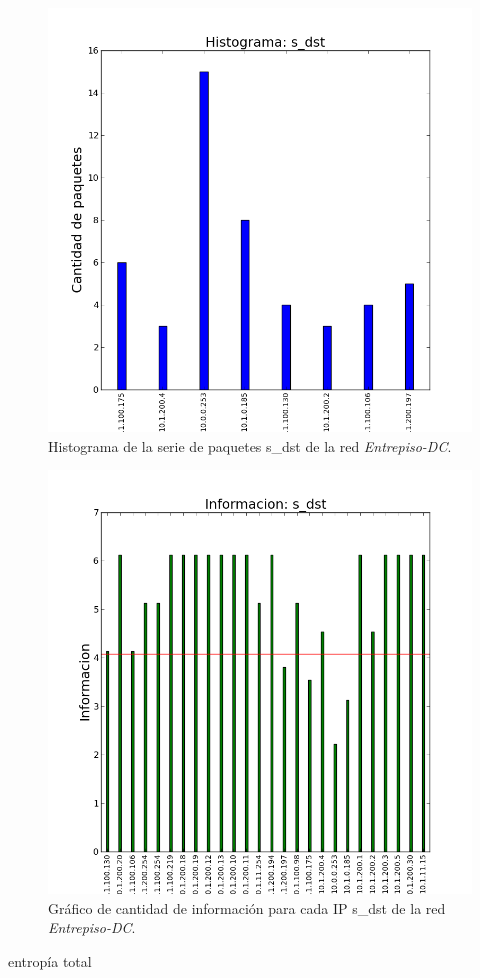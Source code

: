 \documentclass[10pt, a4paper]{article}
\begin{document}
\begin{figure}[H]
  \begin{center}
    \includegraphics[width=0.8\linewidth]{../imgs/entrepiso-dc-ips_s_dst_hist.png}
    \caption{Histograma de la serie de paquetes s\_dst de la red \emph{Entrepiso-DC}.}
    \label{fig:histograma-entrepiso-dc-s-dst}
  \end{center}
\end{figure}
\begin{figure}[H]
  \begin{center}
    \includegraphics[width=0.8\linewidth]{../imgs/entrepiso-dc-ips_s_dst_info.png}
    \caption{Gráfico de cantidad de información para cada IP s\_dst de la red \emph{Entrepiso-DC}.}
    \label{fig:informacion-entrepiso-dc-s-dst}
  \end{center}
\end{figure}
entropía total
\end{document}

